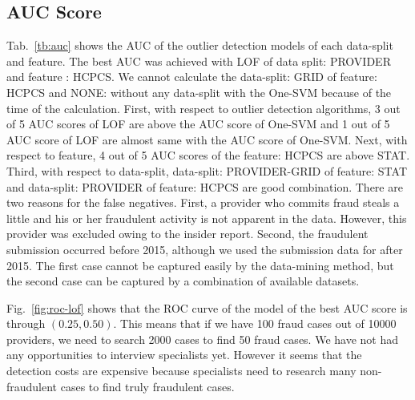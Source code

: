 \documentclass[dvipdfmx, english]{ampmt}             %
\newcommand{\Tabref}[1]{Tab.~\ref{#1}}
\newcommand{\Figref}[1]{Fig.~\ref{#1}}
\newcommand{\Appref}[1]{Appendix ~\ref{#1}}
\begin{document}
\subsection{AUC Score}

\Tabref{tb:auc} shows the AUC of the outlier detection models of each data-split and feature. The best AUC was achieved with LOF of data split: PROVIDER and feature : HCPCS.
We cannot calculate the data-split: GRID of feature: HCPCS and NONE: without any data-split with the One-SVM because of the time of the calculation.
First, with respect to outlier detection algorithms, 3 out of 5 AUC scores of LOF are above the AUC score of One-SVM and 1 out of 5 AUC score of LOF are almost same with the AUC score of One-SVM.
Next, with respect to feature, 4 out of 5 AUC scores of the feature: HCPCS are above STAT.  Third, with respect to data-split, data-split: PROVIDER-GRID of feature: STAT and data-split: PROVIDER of feature: HCPCS are 
good combination.
There are two reasons for the false negatives. First, a provider who commits fraud steals a little and his or her fraudulent activity is not apparent in the data. However, this provider was excluded 
owing to the insider report. Second, the fraudulent submission occurred before 2015, although we used the submission data for after 2015. The first case cannot be captured easily by the data-mining method, 
but the second case can be captured by a combination of available datasets. \par
\Figref{fig:roc-lof} shows that the ROC curve of the model of the best AUC score is through $(0.25, 0.50)$. This means that if we have 100 fraud cases out of 10000 providers, we need to search 2000 cases to find 50 fraud cases.
We have not had any opportunities to interview specialists yet. However it seems that the detection costs are expensive because specialists need to research many non-fraudulent cases to find truly fraudulent cases.
\par
\end{document}
